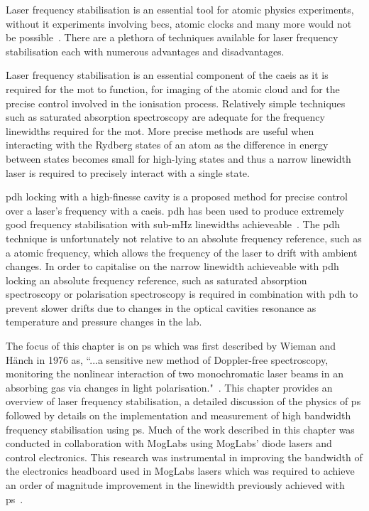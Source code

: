 
Laser frequency stabilisation is an essential tool for atomic physics experiments, without it experiments involving \glspl{bec}, atomic clocks and many more would not be possible~\cite{anderson_observation_1995,ye_quantum_2008}.
There are a plethora of techniques available for laser frequency stabilisation each with numerous advantages and disadvantages.

Laser frequency stabilisation is an essential component of the \gls{caeis} as it is required for the \gls{mot} to function, for imaging of the atomic cloud and for the precise control involved in the ionisation process.
Relatively simple techniques such as saturated absorption spectroscopy are adequate for the frequency linewidths required for the \gls{mot}.
More precise methods are useful when interacting with the Rydberg states of an atom as the difference in energy between states becomes small for high-lying states and thus a narrow linewidth laser is required to precisely interact with a single state.

\Gls{pdh} locking with a high-finesse cavity is a proposed method for precise control over a laser's frequency with a \gls{caeis}.
\Gls{pdh} has been used to produce extremely good frequency stabilisation with sub-\unit[40]{mHz} linewidths achieveable~\cite{kessler_sub-40-mhz-linewidth_2012}.
The \gls{pdh} technique is unfortunately not relative to an absolute frequency reference, such as a atomic frequency, which allows the frequency of the laser to drift with ambient changes.
In order to capitalise on the narrow linewidth achieveable with \gls{pdh} locking an absolute frequency reference, such as saturated absorption spectroscopy or polarisation spectroscopy is required in combination with \gls{pdh} to prevent slower drifts due to changes in the optical cavities resonance as temperature and pressure changes in the lab.

The focus of this chapter is on \gls{ps} which was first described by Wieman and H\"anch in 1976 as, ``...a sensitive new method of Doppler-free spectroscopy, monitoring the nonlinear interaction of two monochromatic laser beams in an absorbing gas via changes in light polarisation."~\cite{wieman_doppler-free_1976,demtroder_laser_2003}.
This chapter provides an overview of laser frequency stabilisation, a detailed discussion of the physics of \gls{ps} followed by details on the implementation and measurement of high bandwidth frequency stabilisation using \gls{ps}.
Much of the work described in this chapter was conducted in collaboration with MogLabs using MogLabs' diode lasers and control electronics.
This research was instrumental in improving the bandwidth of the electronics headboard used in MogLabs lasers which was required to achieve an order of magnitude improvement in the linewidth previously achieved with \gls{ps}~\cite{torrance_sub-kilohertz_2016}.

